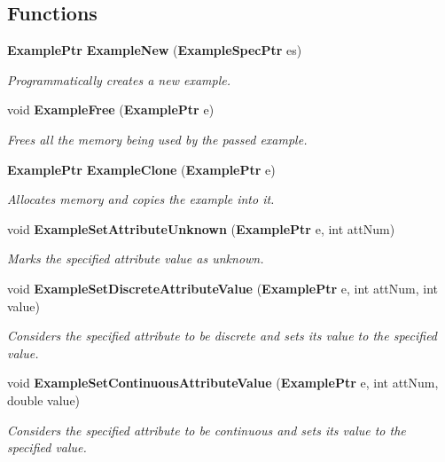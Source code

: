 \subsection*{Functions}
\begin{CompactItemize}
\item 
{\bf Example\-Ptr} {\bf Example\-New} ({\bf Example\-Spec\-Ptr} es)
\begin{CompactList}\small\item\em Programmatically creates a new example. \item\end{CompactList}\item 
void {\bf Example\-Free} ({\bf Example\-Ptr} e)
\begin{CompactList}\small\item\em Frees all the memory being used by the passed example. \item\end{CompactList}\item 
{\bf Example\-Ptr} {\bf Example\-Clone} ({\bf Example\-Ptr} e)
\begin{CompactList}\small\item\em Allocates memory and copies the example into it. \item\end{CompactList}\item 
void {\bf Example\-Set\-Attribute\-Unknown} ({\bf Example\-Ptr} e, int att\-Num)
\begin{CompactList}\small\item\em Marks the specified attribute value as unknown. \item\end{CompactList}\item 
void {\bf Example\-Set\-Discrete\-Attribute\-Value} ({\bf Example\-Ptr} e, int att\-Num, int value)
\begin{CompactList}\small\item\em Considers the specified attribute to be discrete and sets its value to the specified value. \item\end{CompactList}\item 
void {\bf Example\-Set\-Continuous\-Attribute\-Value} ({\bf Example\-Ptr} e, int att\-Num, double value)
\begin{CompactList}\small\item\em Considers the specified attribute to be continuous and sets its value to the specified value. \item\end{CompactList}\item 

\end{CompactItemize}
